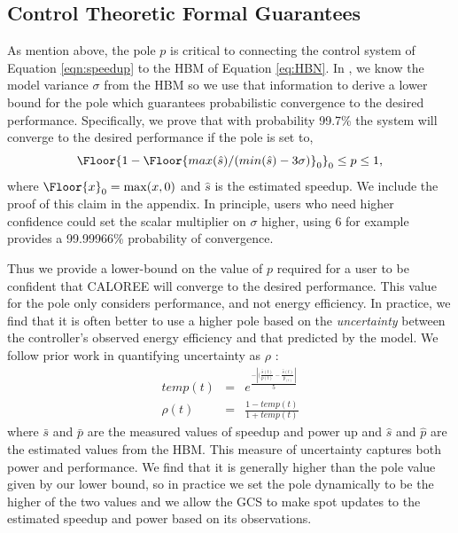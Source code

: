 \subsection{Control Theoretic Formal Guarantees}
\label{sec:guarantees}
As mention above, the pole $p$ is critical to connecting the control
system of Equation \ref{eqn:speedup} to the HBM of Equation
\ref{eq:HBN}.  In \SYSTEM{}, we know the model variance $\sigma$ from
the HBM so we use that information to derive a lower bound for the
pole which guarantees probabilistic convergence to the desired
performance. Specifically, we prove that with probability 99.7\% the
system will converge to the desired performance if the pole is set to,
$$\Floor{1- \Floor{max(\hat{s})/(min(\hat{s}) - 3\sigma)}_0}_0 \leq p
\leq 1,$$ where $\Floor{x}_0 = \max(x,0)$ and $\hat{s}$ is the
estimated speedup. We include the proof of this claim in the appendix. In principle, users who need higher confidence
could set the scalar multiplier on $\sigma$ higher, using $6$ for
example provides a 99.99966\% probability of convergence.  

Thus we provide a lower-bound on the value of $p$ required for a
user to be confident that CALOREE will converge to the desired
performance.  This value for the pole only considers performance,
and not energy efficiency.  In practice, we find that it is
often better to use a higher pole based on the \emph{uncertainty}
between the controller's observed energy efficiency and that predicted
by the model.  We follow prior work in quantifying uncertainty as
$\rho$ \cite{Tokic2010}:
\begin{equation}
  \begin{array}{rcl}
    temp(t) &=& e^{\frac{- \left| (\frac{\bar{s}(t)}{\bar{p}(t)}  -\frac{ \hat{s}(t)}{\hat{p}_(t)} \right| }{5}} \\
    \rho(t) &=& \frac{1-temp(t)}{1+temp(t)} 
  \end{array}
  \label{eqn:uncer}
\end{equation}
where $\bar{s}$ and $\bar{p}$ are the measured values of speedup and
power up and $\hat{s}$ and $\hat{p}$ are the estimated values from the
HBM.  This measure of uncertainty captures both power and performance.
We find that it is generally higher than the pole value given by our
lower bound, so in practice we set the pole dynamically to be the
higher of the two values and we allow the GCS to make spot updates to
the estimated speedup and power based on its observations.  
